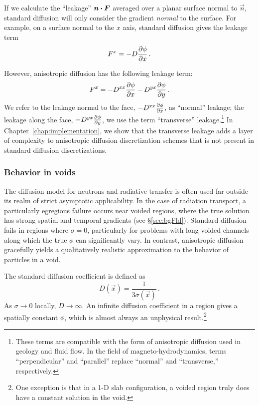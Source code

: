 If we calculate the ``leakage'' $\bm{n} \bm{\cdot} \bm{F}$ averaged over a planar
surface normal to $\vec{n}$, standard diffusion will only consider the gradient
\emph{normal} to the surface. For example, on a surface normal to the $x$ axis,
standard diffusion gives the leakage term
\begin{equation*}
  F^x = - D \frac{\partial \phi}{\partial x}\,.
\end{equation*}

However, anisotropic diffusion has the following leakage term:
\begin{equation*}
  F^x = - D^{xx} \frac{\partial \phi}{\partial x} - D^{yx} \frac{\partial \phi}{\partial y}\,.
\end{equation*}
We refer to the leakage normal to the face, $- D^{xx} \frac{\partial \phi}{\partial x}$, as
``normal'' leakage; the leakage along the face, $- D^{yx}
\frac{\partial \phi}{\partial y}$, we use the term ``transverse'' leakage.\footnote{%
These terms are compatible with the form of anisotropic diffusion used in
geology and fluid flow. In the field of magneto-hydrodynamics, terms
``perpendicular'' and ``parallel'' replace ``normal'' and ``transverse,''
respectively.
}
In Chapter~\ref{chap:implementation}, we show that the transverse leakage adds a
layer of
complexity to anisotropic diffusion discretization schemes that is not present
in standard diffusion discretizations.

\subsubsection{Behavior in voids}\label{sec:adVoids}

The diffusion model for neutrons and radiative transfer is often used far
outside its realm of strict asymptotic applicability. In the case of radiation
transport, a particularly egregious failure occurs near voided regions, where
the true solution has strong spatial and temporal gradients (see
\S\ref{sec:bgFld}). Standard diffusion fails in regions where $\sigma=0$,
particularly for problems with long voided channels along which the true $\phi$
can significantly vary.
In contrast, anisotropic diffusion gracefully yields a qualitatively realistic
approximation to the behavior of particles in a void.

The standard diffusion coefficient is defined as
\begin{equation*}
  D(\vec{x}) = \frac{1}{3\sigma(\vec{x})} \,.
\end{equation*}
As $\sigma\to0$ locally, $D\to \infty$. An infinite diffusion coefficient in a
region gives a spatially constant $\phi$, which is almost always an
unphysical result.\footnote{%
One exception is that in a 1-D slab configuration, a voided region truly does
have a constant solution in the void.}

